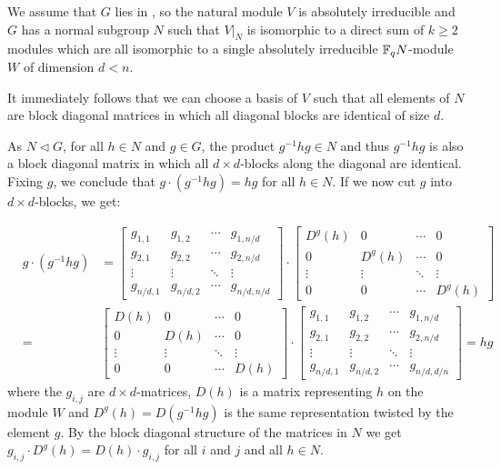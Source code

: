 We assume that $G$ lies in , so the natural module $V$ is
absolutely irreducible and $G$ has a normal subgroup $N$ such that
$V|_N$ is isomorphic to a direct sum of $k\ge 2$ modules which are all
isomorphic to a single absolutely irreducible $\mathbb{F}_q N$-module $W$
of dimension $d < n$.

It immediately follows that we can choose a basis of $V$ such that all
elements of $N$ are block diagonal matrices in which all diagonal blocks
are identical of size $d$.

As $N \triangleleft G$, for all $h \in N$ and $g \in G$,
 the product $g^{-1}hg \in N$ and thus $g^{-1} h g$ is also 
a block diagonal matrix in which all $d \times d$-blocks along the diagonal
are identical. Fixing $g$, we conclude that $g\cdot (g^{-1}hg) = hg$ for all
$h \in N$. If we now cut $g$ into $d \times d$-blocks, we get:

\begin{eqnarray*}
   &g \cdot (g^{-1}hg) & 
 = \left[ \begin{array}{c|c|c|c}
      g_{1,1} & g_{1,2} & \cdots & g_{1,n/d} \\ \hline
      g_{2,1} & g_{2,2} & \cdots & g_{2,n/d} \\ \hline
      \vdots  & \vdots  & \ddots & \vdots    \\ \hline
      g_{n/d,1}&g_{n/d,2}& \cdots& g_{n/d,n/d} \end{array} \right]
\cdot \left[ \begin{array}{c|c|c|c}
      D^g(h) & 0   & \cdots &      0    \\ \hline
         0   &D^g(h)&\cdots &      0    \\ \hline
      \vdots  & \vdots  & \ddots & \vdots    \\ \hline
         0    &    0    & \cdots& D^g(h) \end{array} \right] \\
 &=& \left[ \begin{array}{c|c|c|c}
      D(h)    & 0       & \cdots &     0    \\ \hline
         0    &D(h)     &\cdots &      0    \\ \hline
      \vdots  & \vdots  & \ddots & \vdots    \\ \hline
         0    &    0    & \cdots& D(h)   \end{array} \right]
\cdot \left[ \begin{array}{c|c|c|c}
      g_{1,1} & g_{1,2} & \cdots & g_{1,n/d} \\ \hline
      g_{2,1} & g_{2,2} & \cdots & g_{2,n/d} \\ \hline
      \vdots  & \vdots  & \ddots & \vdots    \\ \hline
      g_{n/d,1}&g_{n/d,2}& \cdots& g_{n/d,d/n} \end{array} \right]
 = hg
\end{eqnarray*}
where the $g_{i,j}$ are $d \times d$-matrices, $D(h)$ is a matrix
representing $h$ on the module $W$ and $D^g(h) = D(g^{-1}hg)$ is the
same representation twisted by the element $g$. By the block diagonal
structure of the matrices in $N$ we get 
$g_{i,j} \cdot D^g(h) = D(h) \cdot g_{i,j}$ for all $i$ and $j$ and 
all $h \in N$.

